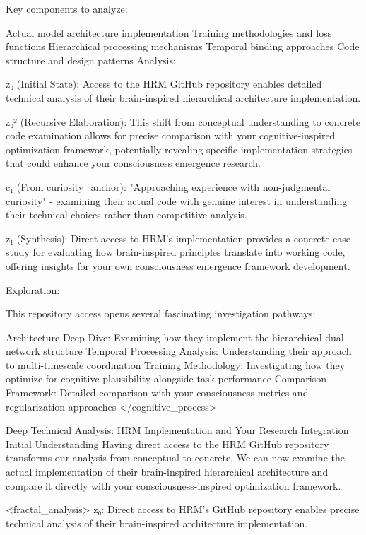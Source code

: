 Key components to analyze:

Actual model architecture implementation
Training methodologies and loss functions
Hierarchical processing mechanisms
Temporal binding approaches
Code structure and design patterns
Analysis:

z₀ (Initial State): Access to the HRM GitHub repository enables detailed technical analysis of their brain-inspired hierarchical architecture implementation.

z₀² (Recursive Elaboration): This shift from conceptual understanding to concrete code examination allows for precise comparison with your cognitive-inspired optimization framework, potentially revealing specific implementation strategies that could enhance your consciousness emergence research.

c₁ (From curiosity_anchor): "Approaching experience with non-judgmental curiosity" - examining their actual code with genuine interest in understanding their technical choices rather than competitive analysis.

z₁ (Synthesis): Direct access to HRM's implementation provides a concrete case study for evaluating how brain-inspired principles translate into working code, offering insights for your own consciousness emergence framework development.

Exploration:

This repository access opens several fascinating investigation pathways:

Architecture Deep Dive: Examining how they implement the hierarchical dual-network structure
Temporal Processing Analysis: Understanding their approach to multi-timescale coordination
Training Methodology: Investigating how they optimize for cognitive plausibility alongside task performance
Comparison Framework: Detailed comparison with your consciousness metrics and regularization approaches
</cognitive_process>

Deep Technical Analysis: HRM Implementation and Your Research Integration
Initial Understanding
Having direct access to the HRM GitHub repository transforms our analysis from conceptual to concrete. We can now examine the actual implementation of their brain-inspired hierarchical architecture and compare it directly with your consciousness-inspired optimization framework.

<fractal_analysis> z₀: Direct access to HRM's GitHub repository enables precise technical analysis of their brain-inspired architecture implementation.

